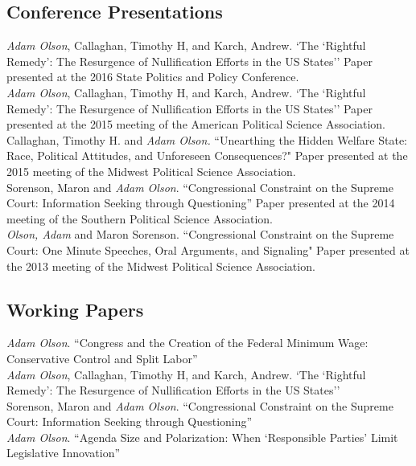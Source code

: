 \documentclass[12pt, letter]{article}
\newcommand{\years}[1]{\marginnote{\normalsize #1}}
\begin{document}
\subsection*{Conference Presentations}
\noindent
\years{2016}\emph{Adam Olson}, Callaghan, Timothy H, and Karch, Andrew. `The `Rightful Remedy': The Resurgence of Nullification Efforts in the US States'' Paper presented at the 2016 State Politics and Policy Conference.\\

\years{2015}\emph{Adam Olson}, Callaghan, Timothy H, and Karch, Andrew. `The `Rightful Remedy': The Resurgence of Nullification Efforts in the US States'' Paper presented at the 2015 meeting of the American Political Science Association.\\

Callaghan, Timothy H. and \emph{Adam Olson.} ``Unearthing the Hidden Welfare State: Race, Political Attitudes, and Unforeseen Consequences?" Paper presented at the 2015 meeting of the Midwest Political Science Association.\\

\years{2014}Sorenson, Maron and \emph{Adam Olson}. ``Congressional Constraint on the Supreme Court: Information Seeking through Questioning'' Paper presented at the 2014 meeting of the Southern Political Science Association.\\

\years{2013}\emph{Olson, Adam} and Maron Sorenson. ``Congressional Constraint on the Supreme Court: One Minute Speeches, Oral Arguments, and Signaling" Paper presented at the 2013 meeting of the Midwest Political Science Association.

\subsection*{Working Papers}
\noindent
\emph{Adam Olson}. ``Congress and the Creation of the Federal Minimum Wage: Conservative Control and Split Labor'' \\

\emph{Adam Olson}, Callaghan, Timothy H, and Karch, Andrew. `The `Rightful Remedy': The Resurgence of Nullification Efforts in the US States'' \\

Sorenson, Maron and \emph{Adam Olson}. ``Congressional Constraint on the Supreme Court: Information Seeking through Questioning'' \\

\emph{Adam Olson}. ``Agenda Size and Polarization: When `Responsible Parties' Limit Legislative Innovation''
\end{document}
